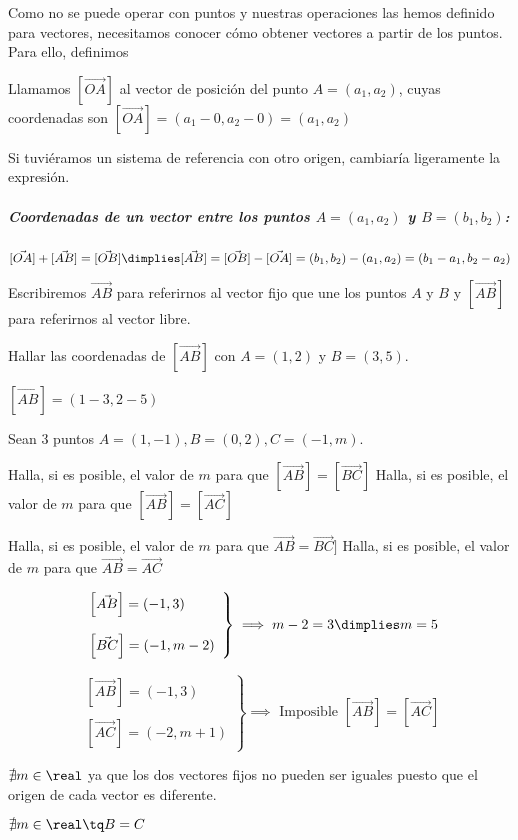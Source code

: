 Como no se puede operar con puntos y nuestras operaciones las hemos definido para vectores, necesitamos conocer cómo obtener vectores a partir de los puntos. Para ello, definimos

\begin{defn} Llamamos $[\vec{OA}]$ al vector de posición del punto $A=(a_1,a_2)$, cuyas coordenadas son $[\vec{OA}] = (a_1-0,a_2-0)=(a_1,a_2)$

\obs Si tuviéramos un sistema de referencia con otro origen, cambiaría ligeramente la expresión.
\end{defn}


\subparagraph{Coordenadas de un vector entre los puntos $A=(a_1,a_2)$ y $B=(b_1,b_2)$:} 

$[\vec{OA}] + [\vec{AB}] =  [\vec{OB}] \dimplies [\vec{AB}] =  [\vec{OB}] - [\vec{OA}] = (b_1,b_2) - (a_1,a_2) = (b_1-a_1,b_2-a_2)$


\obs Escribiremos $\vec{AB}$ para referirnos al vector fijo que une los puntos $A$ y $B$ y $[\vec{AB}]$  para referirnos al vector libre.

\begin{example}
Hallar las coordenadas de $[\vec{AB}]$ con $A=(1,2)$ y $B=(3,5)$.

$[\vec{AB}] = (1-3,2-5)$
\end{example}

\begin{problem}
Sean 3 puntos $A=(1,-1), B=(0,2), C=(-1,m)$.

\ppart Halla, si es posible, el valor de $m$ para que $[\vec{AB}] = [\vec{BC}]$
\ppart Halla, si es posible, el valor de $m$ para que $[\vec{AB}] = [\vec{AC}]$

\ppart Halla, si es posible, el valor de $m$ para que $\vec{AB} = \vec{BC}]$
\ppart Halla, si es posible, el valor de $m$ para que $\vec{AB} = \vec{AC}$
\solution

\spart 
\[
\left.\begin{array}{l}
	\left[\vec{AB}\right] = (-1,3)\\\\
	\left[\vec{BC}\right] = (-1,m-2)
\end{array}\right\} \implies m-2=3 \dimplies m=5
\]

\spart 
\[
\left.\begin{array}{l}
	\left[\vec{AB}\right] = (-1,3)\\\\
	\left[\vec{AC}\right] = (-2,m+1)
\end{array}\right\} \implies \text{ Imposible } [\vec{AB}] = [\vec{AC}]
\]

\spart $\nexists m\in\real$ ya que los dos vectores fijos no pueden ser iguales puesto que el origen de cada vector es diferente.

\spart $\nexists m\in\real \tq B=C$

\end{problem}


